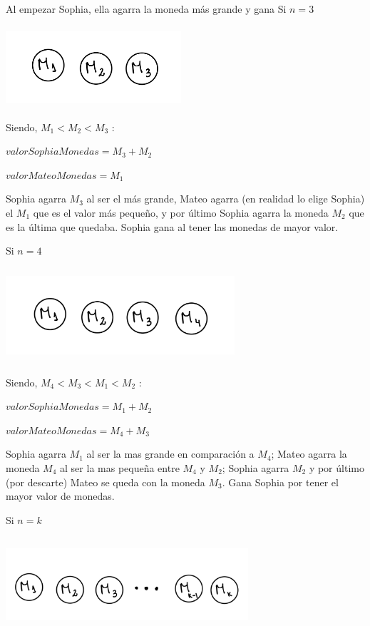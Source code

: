 Al empezar Sophia, ella agarra la moneda más grande y gana
\vskip1cm
Si $n=3$

\includegraphics[width=6.5cm, height=3cm]{images/IMG_1627.jpg}

Siendo, $M_{1}<M_{2}<M_{3}$ : 


$valorSophiaMonedas=M_{3}+M_{2}$

$valorMateoMonedas=M_{1}$

Sophia agarra $M_{3}$ al ser el más grande, Mateo agarra (en realidad lo elige Sophia) el $M_{1}$ que es el valor
más pequeño, y por último Sophia agarra la moneda $M_{2}$ que es la última que quedaba. 
Sophia gana al tener las monedas de mayor valor.

\vskip1cm
Si $n=4$

\includegraphics[width=8.5cm, height=3.5cm]{images/IMG_1628.jpg}

Siendo, $M_{4}<M_{3}<M_{1}<M_{2}$ : 

$valorSophiaMonedas=M_{1}+M_{2}$

$valorMateoMonedas=M_{4}+M_{3}$

Sophia agarra $M_{1}$ al ser la mas grande en comparación a $M_{4}$; Mateo agarra la moneda $M_{4}$ al ser la mas 
pequeña entre $M_{4}$ y $M_{2}$; Sophia agarra $M_{2}$ y por último (por descarte) Mateo se queda con la moneda $M_{3}$.
Gana Sophia por tener el mayor valor de monedas.

\vskip1cm
Si $n=k$

\includegraphics[width=9cm, height=3.5cm]{images/IMG_1629.jpg}

